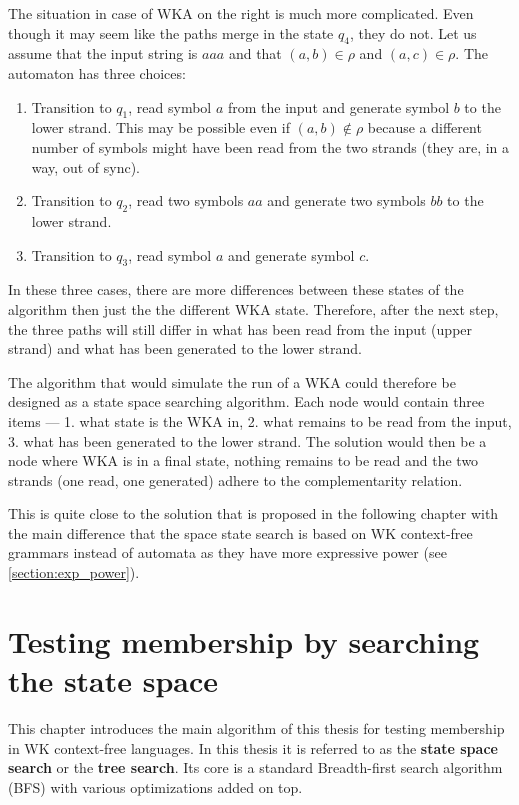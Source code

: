 The situation in case of WKA on the right is much more complicated. Even though it may seem like the paths merge in the state $q_4$, they do not. Let us assume that the input string is $aaa$ and that $(a, b) \in \rho$ and $(a, c) \in \rho$. The automaton has three choices:

\begin{enumerate}
  \item{Transition to $q_1$, read symbol $a$ from the input and generate symbol $b$ to the lower strand. This may be possible even if $(a, b) \notin \rho$ because a different number of symbols might have been read from the two strands (they are, in a way, out of sync).}

  \item{Transition to $q_2$, read two symbols $aa$ and generate two symbols $bb$ to the lower strand.}

  \item{Transition to $q_3$, read symbol $a$ and generate symbol $c$.}
\end{enumerate}

In these three cases, there are more differences between these states of the algorithm then just the the different WKA state. Therefore, after the next step, the three paths will still differ in what has been read from the input (upper strand) and what has been generated to the lower strand.

The algorithm that would simulate the run of a WKA could therefore be designed as a state space searching algorithm. Each node would contain three items --- 1. what state is the WKA in, 2. what remains to be read from the input, 3. what has been generated to the lower strand. The solution would then be a node where WKA is in a final state, nothing remains to be read and the two strands (one read, one generated) adhere to the complementarity relation.

This is quite close to the solution that is proposed in the following chapter with the main difference that the space state search is based on WK context-free grammars instead of automata as they have more expressive power (see \ref{section:exp_power}).

\chapter{Testing membership by searching the state space} \label{chapter:parse_tree}
This chapter introduces the main algorithm of this thesis for testing membership in WK context-free languages. In this thesis it is referred to as the \textbf{state space search} or the \textbf{tree search}. Its core is a standard Breadth-first search algorithm (BFS) with various optimizations added on top.


